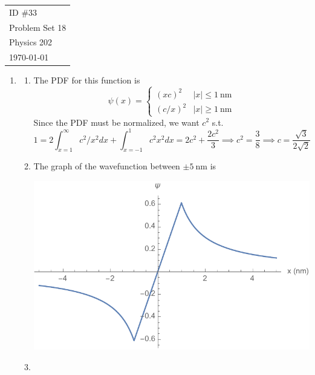 \documentclass[fleqn]{article}[12pt]
\begin{document}
    \begin{tabular}{l}
        ID \#33 \\
        Problem Set 18 \\
        Physics 202 \\
        \today
    \end{tabular}

\begin{enumerate}
    \item \begin{enumerate}
        \item The PDF for this function is
        \begin{equation*}
            \psi(x) = \begin{cases}
                (xc)^2 & |x| \leq \SI{1}{\nm} \\
                (c/x)^2 & |x| \geq \SI{1}{\nm}
        \end{cases}
        \end{equation*}
        Since the PDF must be normalized, we want $c^2$ s.t.
        \begin{equation*}
            1 = 2\int_{x=1}^{\infty} c^2/x^2 dx + \int_{x=-1}^{1} c^2x^2 dx = 2c^2 + \frac{2 c^2}{3} \implies c^2 = \frac{3}{8} \implies c = \frac{\sqrt{3}}{2\sqrt{2}}
        \end{equation*}

        \item The graph of the wavefunction between $\pm \SI{5}{\nm}$ is

        \includegraphics{psi-graph-raw}

        \item


\end{enumerate}
\end{enumerate}
\end{document}
